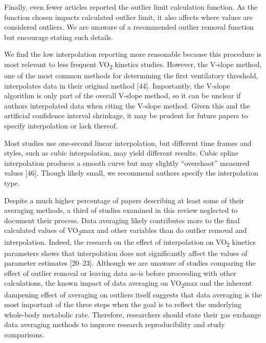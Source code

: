 \documentclass[
  letterpaper,
  DIV=11,
  numbers=noendperiod]{scrartcl}
\begin{document}
Finally, even fewer articles reported the outlier limit calculation
function. As the function chosen impacts calculated outlier limit, it
also affects where values are considered outliers. We are unaware of a
recommended outlier removal function but encourage stating such details.

We find the low interpolation reporting more reasonable because this
procedure is most relevant to less frequent VO\textsubscript{2} kinetics
studies. However, the V-slope method, one of the most common methods for
determining the first ventilatory threshold, interpolates data in their
original method {[}44{]}. Importantly, the V-slope algorithm is only
part of the overall V-slope method, so it can be unclear if authors
interpolated data when citing the V-slope method. Given this and the
artificial confidence interval shrinkage, it may be prudent for future
papers to specify interpolation or lack thereof.

Most studies use one-second linear interpolation, but different time
frames and styles, such as cubic interpolation, may yield different
results. Cubic spline interpolation produces a smooth curve but may
slightly ``overshoot'' measured values {[}46{]}. Though likely small, we
recommend authors specify the interpolation type.

Despite a much higher percentage of papers describing at least some of
their averaging methods, a third of studies examined in this review
neglected to document their process. Data averaging likely contributes
more to the final calculated values of VO\textsubscript{2}max and other
variables than do outlier removal and interpolation. Indeed, the
research on the effect of interpolation on VO\textsubscript{2} kinetics
parameters shows that interpolation does not significantly affect the
values of parameter estimates {[}20--23{]}. Although we are unaware of
studies comparing the effect of outlier removal or leaving data as-is
before proceeding with other calculations, the known impact of data
averaging on VO\textsubscript{2}max and the inherent dampening effect of
averaging on outliers itself suggests that data averaging is the most
important of the three steps when the goal is to reflect the underlying
whole-body metabolic rate. Therefore, researchers should state their gas
exchange data averaging methods to improve research reproducibility and
study comparisons.
\end{document}
